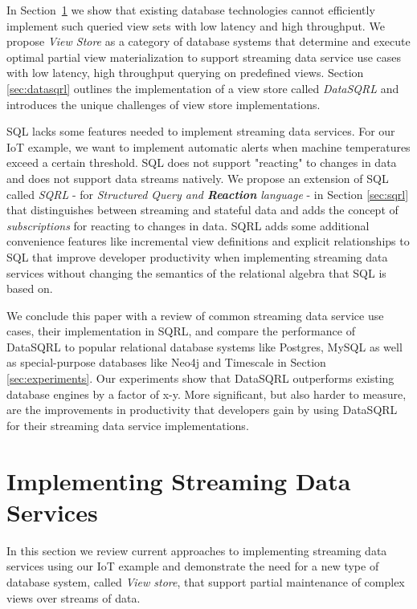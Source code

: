 \documentclass[	DIV=calc,%
							paper=letter,%
							fontsize=11pt,%
							twocolumn]{scrartcl}	 					%
\begin{document}
In Section~\ref{sec:viewstore} we show that existing database technologies cannot efficiently implement such queried view sets with low latency and high throughput. We propose \emph{View Store} as a category of database systems that determine and execute optimal partial view materialization to support streaming data service use cases with low latency, high throughput querying on predefined views. Section \ref{sec:datasqrl} outlines the implementation of a view store called \emph{DataSQRL} and introduces the unique challenges of view store implementations.

SQL lacks some features needed to implement streaming data services. For our IoT example, we want to implement automatic alerts when machine temperatures exceed a certain threshold. SQL does not support "reacting" to changes in data and does not support data streams natively. We propose an extension of SQL called \emph{SQRL} - for \emph{Structured Query and \textbf{Reaction} language} - in Section \ref{sec:sqrl} that distinguishes between streaming and stateful data and adds the concept of \emph{subscriptions} for reacting to changes in data. SQRL adds some additional convenience features like incremental view definitions and explicit relationships to SQL that improve developer productivity when implementing streaming data services without changing the semantics of the relational algebra that SQL is based on.

We conclude this paper with a review of common streaming data service use cases, their implementation in SQRL, and compare the performance of DataSQRL to popular relational database systems like Postgres, MySQL as well as special-purpose databases like Neo4j and Timescale in Section \ref{sec:experiments}. Our experiments show that DataSQRL outperforms existing database engines by a factor of x-y. More significant, but also harder to measure, are the improvements in productivity that developers gain by using DataSQRL for their streaming data service implementations.

\section{Implementing Streaming Data Services}
\label{sec:viewstore}

In this section we review current approaches to implementing streaming data services using our IoT example and demonstrate the need for a new type of database system, called \emph{View store}, that support partial maintenance of complex views over streams of data.
\end{document}
